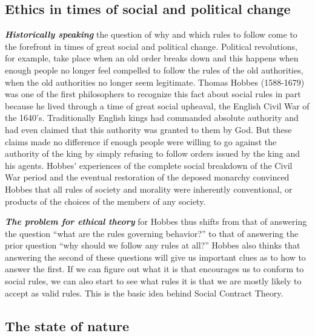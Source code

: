 \documentclass[12pt, openany]{book}
\begin{document}
\hypertarget{ethics-in-times-of-social-and-political-change}{%
\subsection*{Ethics in times of social and political change}\label{ethics-in-times-of-social-and-political-change}}


\textbf{\emph{Historically speaking}} the question of why and which rules to follow come to the forefront in times of great social and political change. Political revolutions, for example, take place when an old order breaks down and this happens when enough people no longer feel compelled to follow the rules of the old authorities, when the old authorities no longer seem legitimate. Thomas Hobbes (1588-1679) was one of the first philosophers to recognize this fact about social rules in part because he lived through a time of great social upheaval, the English Civil War of the 1640's. Traditionally English kings had commanded absolute authority and had even claimed that this authority was granted to them by God. But these claims made no difference if enough people were willing to go against the authority of the king by simply refusing to follow orders issued by the king and his agents. Hobbes' experiences of the complete social breakdown of the Civil War period and the eventual restoration of the deposed monarchy convinced Hobbes that all rules of society and morality were inherently conventional, or products of the choices of the members of any society.

\textbf{\emph{The problem for ethical theory}} for Hobbes thus shifts from that of answering the question ``what are the rules governing behavior?'' to that of answering the prior question ``why should we follow any rules at all?'' Hobbes also thinks that answering the second of these questions will give us important clues as to how to answer the first. If we can figure out what it is that encourages us to conform to social rules, we can also start to see what rules it is that we are mostly likely to accept as valid rules. This is the basic idea behind Social Contract Theory.

\hypertarget{the-state-of-nature}{%
\subsection*{The state of nature}\label{the-state-of-nature}}
\end{document}
